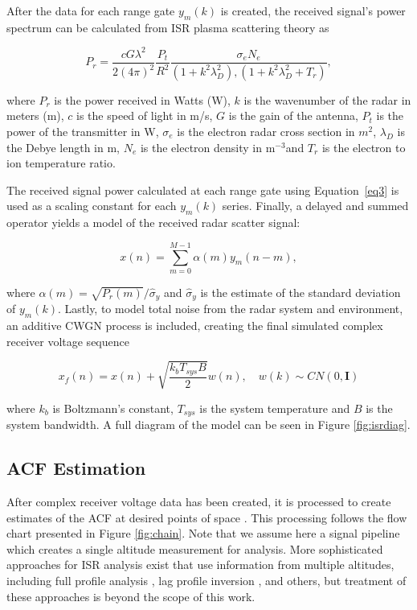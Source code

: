 \documentclass[draft,ras]{agutex}
\begin{document}
\begin{article}
After the data for each range gate $y_m(k)$ is created, the received signal's power spectrum can be calculated from ISR plasma scattering theory as 

\begin{equation}
\label{eq3}
P_r = \frac{cG \lambda^2}{2(4\pi)^2}\frac{P_t }{R^2}\frac{\sigma_e N_e}{(1+k^2\lambda_D^2),(1+k^2\lambda_D^2 + T_r)},
\end{equation}
 
 \noindent where $P_r$ is the power received in Watts (W), $k$ is the wavenumber of the radar in meters (m), $c$ is the speed of light in m/s, $G$ is the gain of the antenna, $P_t$ is the power of the transmitter in W, $\sigma_e$ is the electron radar cross section in $m^2$,  $\lambda_D$ is the Debye length in m, $N_e$ is the electron density in m$^{-3}$and $T_r$ is the electron to ion temperature ratio.
  
The received signal power calculated at each range gate using Equation~\ref{eq3} is used as a scaling constant for each $y_m(k)$ series.  Finally, a delayed and summed operator yields a model of the received radar scatter signal:
 
\begin{equation}
\label{eq4}
x(n) = \displaystyle\sum\limits_{m =0}^{M-1} \alpha(m)y_m(n-m),
\end{equation}

\noindent where $\alpha(m) = \sqrt{P_r(m)}/\widehat{\sigma}_y$ and $\widehat{\sigma}_y$ is the estimate of the standard deviation of $y_m(k)$. Lastly, to model total noise from the radar system and environment, an additive CWGN process is included, creating the final simulated complex receiver voltage sequence

\begin{equation}
\label{eq:addnoise}
x_f(n) = x(n) +\sqrt{\frac{k_bT_{sys}B}{2}} w(n), \quad w(k)\sim CN(0,\mathbf{I})
\end{equation}

\noindent where $k_b$ is Boltzmann's constant, $T_{sys}$ is the system temperature and $B$ is the system bandwidth.
A full diagram of the model can be seen in Figure \ref{fig:isrdiag}.


\subsection{ACF Estimation}

After complex receiver voltage data has been created, it is processed to create estimates of the ACF at desired points of space \citep[see, e.g.,][]{farley1969,nygren1996}. This processing follows the flow chart presented in Figure \ref{fig:chain}.  Note that we assume here a signal pipeline which creates a single altitude measurement for analysis.  More sophisticated approaches for ISR analysis exist that use information from multiple altitudes, including full profile analysis \citep{RDS:RDS3308}, lag profile inversion \citep{Virtanen:20082vx}, and others, but treatment of these approaches is beyond the scope of this work.


\end{article}
\end{document}
